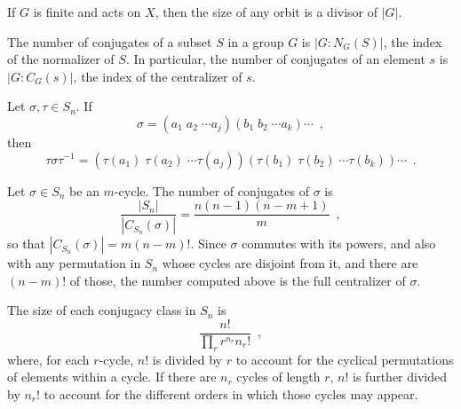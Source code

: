 \begin{corollary}
	\cite[103]{Rotman1967}
	If $G$ is finite and acts on $X$, then the size of any orbit is a divisor of $|G|$.
\end{corollary}

\begin{proposition}
	\cite[123]{DummitFoote2004}
	The number of conjugates of a subset $S$ in a group $G$ is $|G : N_G(S)|$, the index
	of the normalizer of $S$. In particular, the number of conjugates of an element $s$ is
	$|G : C_G(s)|$, the index of the centralizer of $s$.
\end{proposition}

\begin{proposition}
	\cite[125]{DummitFoote2004}
	Let $\sigma, \tau \in S_n$. If
	\begin{equation}
		\sigma = (a_1 \; a_2 \; \cdots a_j) (b_1 \; b_2 \; \cdots a_k) \cdots \enspace,
	\end{equation}
	then
	\begin{equation}
		\tau \sigma \tau^{-1} = (\tau(a_1) \; \tau(a_2) \; \cdots
		\tau(a_j)) (\tau(b_1) \; \tau(b_2) \; \cdots \tau(b_k)) \cdots \enspace.
	\end{equation}
\end{proposition}

\begin{example}
	\cite[127]{DummitFoote2004}
	Let $\sigma \in S_n$ be an $m$-cycle. The number of conjugates of $\sigma$ is
	\begin{equation}
		\frac{|S_n|}{|C_{S_n}(\sigma)|} = \frac{n (n - 1) (n - m + 1)}{m} \enspace,
	\end{equation}
	so that $|C_{S_n}(\sigma)| = m (n - m)!$. Since $\sigma$ commutes with its powers,
	and also with any permutation in $S_n$ whose cycles are disjoint from it, and there are
	$(n - m)!$ of those, the number computed above is the full centralizer of $\sigma$.
\end{example}

\begin{example}
	\cite[132]{DummitFoote2004}
	The size of each conjugacy class in $S_n$ is
	\begin{equation}
		\frac{n!}{\prod_{r}r^{n_r}n_r!} \enspace,
	\end{equation}
	where, for each $r$-cycle, $n!$ is divided by $r$ to account for the cyclical permutations
	of elements within a cycle. If there are $n_r$ cycles of length $r$, $n!$ is further divided
	by $n_r!$ to account for the different orders in which those cycles may appear.
\end{example}

